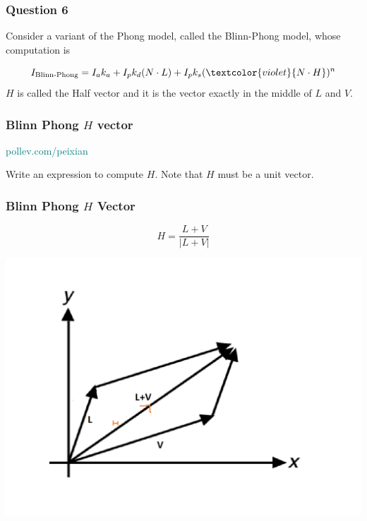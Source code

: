 \documentclass{beamer}
\begin{document}
\begin{frame}
    \frametitle{Question 6}

    Consider a variant of the Phong model, called the Blinn-Phong model, whose computation is 

    \begin{equation*}
        I_\text{Blinn-Phong} = I_a k_a + I_p k_d  (N \cdot L) + I_p k_s (\textcolor{violet}{N \cdot H})^n
    \end{equation*}
    $H$ is called the Half vector and it is the vector exactly in the middle of $L$ and $V$.

\end{frame}

\begin{frame}
    \frametitle{Blinn Phong $H$ vector}


    \begin{tcolorbox}[colback=teal!5!white]
        \textcolor{teal}{pollev.com/peixian}
    \end{tcolorbox}

    \vspace*{1em}

    Write an expression to compute $H$. Note that $H$ must be a unit vector.

    \vspace*{2em}

\end{frame}

\begin{frame}
    \frametitle{Blinn Phong $H$ Vector}

    \begin{equation*}
        H = \frac{L + V}{|L + V|}
    \end{equation*}

    \begin{center}
        \includegraphics[scale=0.4]{h-vector.png}
    \end{center}

\end{frame}
\end{document}
